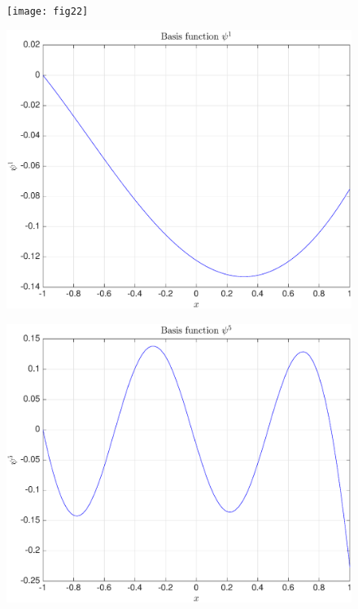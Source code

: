\documentclass[11pt,a4paper]{article}
\theoremstyle{definition}
\theoremstyle{theorem}
\begin{document}
	\begin{figure}
		\center
		\texttt{[image: fig22]}
		\caption{}
	\end{figure}
	
	\begin{figure}
		\center
		\includegraphics[scale=0.5]{fig23}
		\caption{}
	\end{figure}
	
	\begin{figure}
		\center
		\includegraphics[scale=0.5]{fig24}
		\caption{}
	\end{figure}
	
\end{document}
